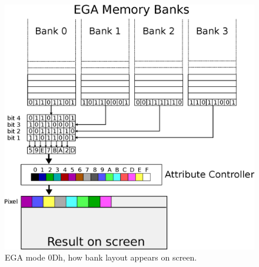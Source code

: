 \documentclass[book.tex]{subfiles}
\begin{document}
\begin{figure}[H]
\centering
 \includegraphics[width=1.0\textwidth]{imgs/drawings/mode0Dh.eps}
\caption{EGA mode 0Dh, how bank layout appears on screen.}
\label{fig:ega_bank_layout}
\end{figure}
 
\end{document}
